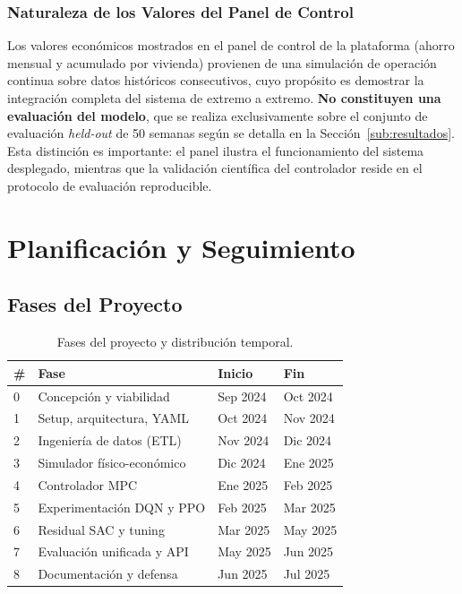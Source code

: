 \documentclass[12pt, a4paper, twoside]{report}
\begin{document}
\subsection{Naturaleza de los Valores del Panel de Control}
\label{sub:panel}

Los valores económicos mostrados en el panel de control de la plataforma (ahorro
mensual y acumulado por vivienda) provienen de una simulación de operación
continua sobre datos históricos consecutivos, cuyo propósito es demostrar la
integración completa del sistema de extremo a extremo. \textbf{No constituyen
una evaluación del modelo}, que se realiza exclusivamente sobre el conjunto de
evaluación \textit{held-out} de 50 semanas según se detalla en la
Sección~\ref{sub:resultados}. Esta distinción es importante: el panel ilustra el
funcionamiento del sistema desplegado, mientras que la validación científica del
controlador reside en el protocolo de evaluación reproducible.

\chapter{Planificación y Seguimiento}
\label{chap:planificacion}

\section{Fases del Proyecto}

\begin{table}[H]
\centering
\caption{Fases del proyecto y distribución temporal.}
\label{tab:fases}
\begin{tabularx}{\textwidth}{C{0.5cm}L{4.2cm}C{1.8cm}C{1.8cm}}
\toprule
\textbf{\#} & \textbf{Fase} & \textbf{Inicio} & \textbf{Fin} \\
 & Concepción y viabilidad & Sep 2024 & Oct 2024 \\
1 & Setup, arquitectura, YAML & Oct 2024 & Nov 2024 \\
2 & Ingeniería de datos (ETL) & Nov 2024 & Dic 2024 \\
3 & Simulador físico-económico & Dic 2024 & Ene 2025 \\
4 & Controlador MPC & Ene 2025 & Feb 2025 \\
5 & Experimentación DQN y PPO & Feb 2025 & Mar 2025 \\
6 & Residual SAC y tuning & Mar 2025 & May 2025 \\
7 & Evaluación unificada y API & May 2025 & Jun 2025 \\
8 & Documentación y defensa & Jun 2025 & Jul 2025 \\
\bottomrule
\end{tabularx}
\end{table}
\end{document}
